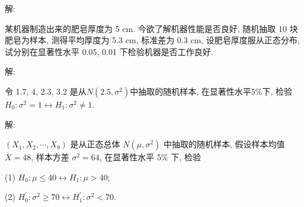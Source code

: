 \documentclass[standard]{ExBook}
\begin{document}
\begin{qitems}
\vspace{-5em}

    \begin{bbox}
解: 
    \end{bbox}

\vspace{-5em}

    \begin{bbox}
    \begin{shaded}
        \qitem
某机器制造出来的肥皂厚度为 5 cm. 今欲了解机器性能是否良好, 随机抽取 10 块肥皂为样本, 测得平均厚度为 5.3 cm, 标准差为 0.3 cm, 设肥皂厚度服从正态分布, 试分别在显著性水平 0.05, 0.01 下检验机器是否工作良好.
    \end{shaded}
    \end{bbox}

\vspace{-5em}

    \begin{bbox}
解: 
    \end{bbox}

\vspace{-5em}

    \begin{bbox}
    \begin{shaded}
        \qitem
令 1.7, 4, 2.3, 3.2 是从$N(2.5,\sigma^2)$中抽取的随机样本, 在显著性水平5\%下, 检验 $H_0 : \sigma^2=1 \longleftrightarrow H_1 : \sigma^2 \neq 1$.
    \end{shaded}
    \end{bbox}

\vspace{-5em}

    \begin{bbox}
解: 
    \end{bbox}

\vspace{-5em}

    \begin{bbox}
    \begin{shaded}
        \qitem
$(X_1, X_2, \cdots, X_9)$ 是从正态总体 $N(\mu, \sigma^2)$ 中抽取的随机样本, 假设样本均值 $\overline{X} = 48$, 样本方差 $\sigma^2 = 64$, 在显著性水平 5\% 下, 检验

(1) $H_0 : \mu \leq 40 \longleftrightarrow H_1 : \mu > 40$;

(2) $H_0^{'} : \sigma^2 \geq 70 \longleftrightarrow H_1^{'} : \sigma^2 < 70$.
    \end{shaded}
    \end{bbox}


\end{qitems}
\end{document}
